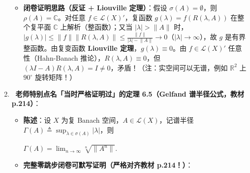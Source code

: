 \documentclass[11pt,a4paper]{article}
\providecommand{\tightlist}{\setlength{\itemsep}{2pt}\setlength{\parskip}{0pt}}
\newcommand{\WarnBadge}{%
  \tcbox[on line, colback=CoralSoft, colframe=CoralMain!45!BorderColor, boxrule=0.35pt,
    arc=3pt, left=3.5pt, right=3.5pt, top=0.5pt, bottom=0.5pt, boxsep=0pt]{\scriptsize\bfseries\color{CoralMain}注意}\,%
}
\newcommand{\FitDisplayMath}[1]{%
  \par\vspace{4.5pt}\noindent
  \begin{adjustbox}{max width=\linewidth, center}
    $\displaystyle #1$
  \end{adjustbox}
  \par\vspace{4.5pt}%
}
\begin{document}
\begin{enumerate}
  \begin{itemize}
  \tightlist
  \item
    \textbf{闭卷证明思路（反证 + Liouville 定理）}：假设 \(\sigma(A) = \emptyset\)，则 \(\rho(A) = \mathbb{C}\)。对任意 \(f \in \mathcal{L}(X)'\)，复函数 \(g(\lambda) = f(R(\lambda, A))\) 在整个复平面 \(\mathbb{C}\) 上解析（整函数）；又当 \(\lvert\lambda\rvert > \lVert A\rVert\) 时，\(\lvert g(\lambda)\rvert \le \lVert f\rVert \lVert R(\lambda, A)\rVert \le \frac{\lVert f\rVert}{\lvert\lambda\rvert - \lVert A\rVert} \to 0\)（\(\lvert\lambda\rvert \to \infty\)），故 \(g\) 是有界整函数。由复变函数 \textbf{Liouville 定理}，\(g(\lambda) \equiv 0\)。由 \(f \in \mathcal{L}(X)'\) 任意性（Hahn-Banach 推论），\(R(\lambda, A) \equiv 0\)，但 \((\lambda I - A)R(\lambda, A) = I \neq 0\)，矛盾！（注：实空间可以无谱，例如 \(\mathbb{R}^2\) 上 \(90^\circ\) 旋转矩阵！）
  \end{itemize}
\item
  \textbf{\WarnBadge{} 老师特别点名「当时严格证明过」的定理 6.5（Gelfand 谱半径公式，教材 p.214）}：

  \begin{itemize}
  \tightlist
  \item
    \textbf{陈述}：设 \(X\) 为复 Banach 空间，\(A \in \mathcal{L}(X)\)，记谱半径 \(\Gamma(A) \triangleq \sup_{\lambda \in \sigma(A)}\lvert\lambda\rvert\)，则 
\FitDisplayMath{\Gamma(A) = \lim_{n \to \infty} \sqrt[n]{\lVert A^n\rVert}.}

  \item
    \textbf{完整零跳步闭卷可默写证明（严格对齐教材 p.214！）}：


\end{itemize}
\end{enumerate}
\end{document}
